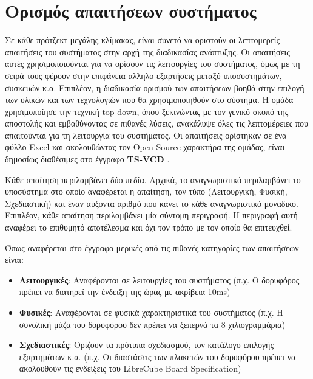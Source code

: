 \documentclass[a4paper,nobib,justified]{tufte-book}
\begin{document}
\section{Ορισμός απαιτήσεων συστήματος}
Σε κάθε πρότζεκτ μεγάλης κλίμακας, είναι συνετό να οριστούν οι λεπτομερείς απαιτήσεις του συστήματος στην αρχή της διαδικασίας ανάπτυξης. Οι απαιτήσεις αυτές χρησιμοποιούνται για να ορίσουν τις λειτουργίες του συστήματος, όμως με τη σειρά τους φέρουν στην επιφάνεια αλληλο-εξαρτήσεις μεταξύ υποσυστημάτων, συσκευών κ.α. Επιπλέον, η διαδικασία ορισμού των απαιτήσεων βοηθά στην επιλογή των υλικών και των τεχνολογιών που θα χρησιμοποιηθούν στο σύστημα. Η ομάδα χρησιμοποίησε την τεχνική top-down, όπου ξεκινώντας με τον γενικό σκοπό της αποστολής και εμβαθύνοντας σε πιθανές λύσεις, ανακάλυψε όλες τις λεπτομέρειες που απαιτούνται για τη λειτουργία του συστήματος. Οι απαιτήσεις ορίστηκαν σε ένα φύλλο Excel και ακολουθώντας τον Open-Source χαρακτήρα της ομάδας, είναι δημοσίως διαθέσιμες στο έγγραφο \textbf{TS-VCD} .

Κάθε απαίτηση περιλαμβάνει δύο πεδία. Αρχικά, το αναγνωριστικό περιλαμβάνει το υποσύστημα στο οποίο αναφέρεται η απαίτηση, τον τύπο (Λειτουργική, Φυσική, Σχεδιαστική) και έναν αύξοντα αριθμό που κάνει το κάθε αναγνωριστικό μοναδικό. Επιπλέον, κάθε απαίτηση περιλαμβάνει μία σύντομη περιγραφή. Η περιγραφή αυτή αναφέρει το επιθυμητό αποτέλεσμα και όχι τον τρόπο με τον οποίο θα επιτευχθεί.

Όπως αναφέρεται στο έγγραφο  μερικές από τις πιθανές κατηγορίες των απαιτήσεων είναι:
\begin{itemize}
	\item \textbf{Λειτουργικές}: Αναφέρονται σε λειτουργίες του συστήματος (π.χ. Ο δορυφόρος πρέπει να διατηρεί την ένδειξη της ώρας με ακρίβεια 10ms)
	\item \textbf{Φυσικές}: Αναφέρονται σε φυσικά χαρακτηριστικά του συστήματος (π.χ. Η συνολική μάζα του δορυφόρου δεν πρέπει να ξεπερνά τα 8 χιλιογραμμάρια)
	\item \textbf{Σχεδιαστικές}: Ορίζουν τα πρότυπα σχεδιασμού, τον κατάλογο επιλογής εξαρτημάτων κ.α. (π.χ. Οι διαστάσεις των πλακετών του δορυφόρου πρέπει να ακολουθούν τις ενδείξεις του LibreCube Board Specification)
\end{itemize}
\end{document}
